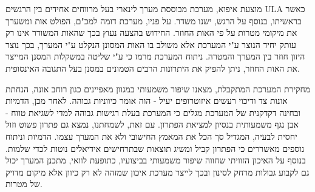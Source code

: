 מוצעת איפוא, מערכת מבוססת מערך לינארי בעל מרווחים אחידים בין הרגשים
\textenglish{ULA}
כאשר בראשיתו, בנוסף על הרגש, ישנו משדר.
על פניו, מערכת דומה למכ"ם, הפולט אות ומשערך את מיקומי מטרות על פי האות החוזר.
החידוש בהצעה נעוץ בכך שהאות המשודר אינו רק עותק יחיד הנוצר ע"י המערכת אלא משולב בו האות המסונן הנקלט ע"י המערך, בכך נוצר היזון חוזר בין המערך והמטרה.
ניתוח המערכת מרמז כי ע"י שליטה במשקלות המסנן המייצר את האות החוזר, ניתן להפיק את היתרונות הרבים הטמונים במסנן בעל התגובה האינסופית.
\par
מחקירת המערכת המתקבלת, מצאנו שיפור משמעותי במגוון מאפיינים כגון רוחב אונה, הנחתת אונות צד ודיכוי רעשים איזוטרופים יעיל - הוה אומר כיווניות גבוהה.
לאחר מכן, הדמיות ובחינה דקדקנית של המערכת מגלים כי המערכת בעלת רגישות גבוהה למדי לשגיאת טווח - אבן נגף משמעותית בנסיון למציאת הפתרון.
עם זאת, לשמחתנו, נמצא גם פתרון פשוט וזול יחסית לבעיה, המגדיל סך הכל את המאמץ החישובי ולא את המערך עצמו.
הדמיות וניתוח נוספים מאשררים כי הפתרון קביל ומשיג תוצאות שבתרחישים אידיאלים נוטות לכדי שלמות.
בנוסף על האיכון הזוויתי שחווה שיפור משמעותי בביצועיו, כתופעת לוואי, מתכנן המערך יכול גם לקבוע גבולות מרחק לסינון ובכך לייצר מערכת איכון שמזהה לא רק כיוון אלא מיקום מדויק של מטרות.